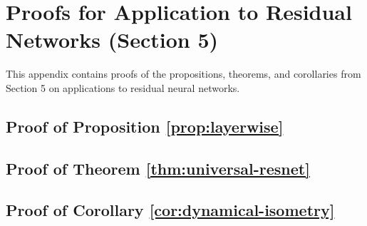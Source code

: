 
\section{Proofs for Application to Residual Networks (Section 5)}

This appendix contains proofs of the propositions, theorems, and corollaries from Section 5 on applications to residual neural networks.

\subsection{Proof of Proposition \ref{prop:layerwise}}


\subsection{Proof of Theorem \ref{thm:universal-resnet}}


\subsection{Proof of Corollary \ref{cor:dynamical-isometry}}

